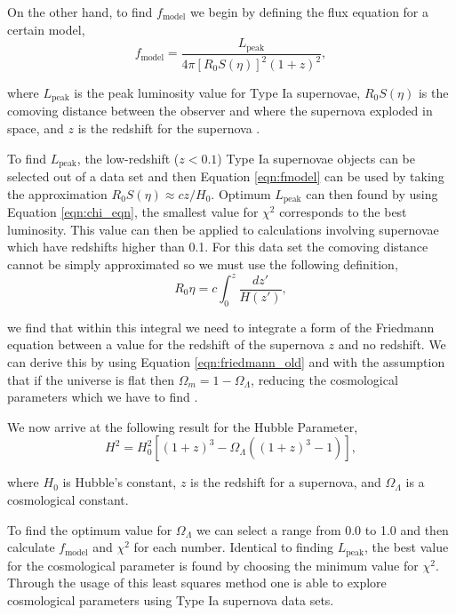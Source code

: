 \documentclass[twocolumn]{revtex4}
\begin{document}
On the other hand, to find $f_\text{model}$ we begin by defining the flux equation for a certain model,
\begin{equation}
f_\text{model}=\frac{L_\text{peak}}{4\pi [R_0 S(\eta)]^2 (1+z)^2},
\label{eqn:fmodel}
\end{equation}

where $L_\text{peak}$ is the peak luminosity value for Type Ia supernovae, $R_0 S(\eta)$ is the comoving distance between the observer and where the supernova exploded in space, and $z$ is the redshift for the supernova \cite{script}.

To find $L_\text{peak}$, the low-redshift ($z<0.1$) Type Ia supernovae objects can be selected out of a data set and then Equation \ref{eqn:fmodel} can be used by taking the approximation $R_0 S(\eta) \approx cz/H_0$. Optimum $L_\text{peak}$ can then found by using Equation \ref{eqn:chi_eqn}, the smallest value for $\chi^2$ corresponds to the best luminosity. This value can then be applied to calculations involving supernovae which have redshifts higher than 0.1. For this data set the comoving distance cannot be simply approximated so we must use the following definition,
\begin{equation}
R_0 \eta = c \int_0^z \frac{dz'}{H(z')},
\label{eqn:comoving_integral}
\end{equation}

we find that within this integral we need to integrate a form of the Friedmann equation between a value for the redshift of the supernova $z$ and no redshift. We can derive this by using Equation \ref{eqn:friedmann_old} and with the assumption that if the universe is flat then $\Omega_m = 1 - \Omega_{\Lambda}$, reducing the cosmological parameters which we have to find \cite{script}. 

We now arrive at the following result for the Hubble Parameter,
\begin{equation}
H^2 = H_0^2 [(1+z)^3 - \Omega_{\Lambda} ((1+z)^3-1)],
\label{eqn:hubble_parameter}
\end{equation}

where $H_0$ is Hubble's constant, $z$ is the redshift for a supernova, and $\Omega_\Lambda$ is a cosmological constant.

To find the optimum value for $\Omega_\Lambda$ we can select a range from 0.0 to 1.0 and then calculate $f_\text{model}$ and $\chi^2$ for each number. Identical to finding $L_\text{peak}$, the best value for the cosmological parameter is found by choosing the minimum value for $\chi^2$. Through the usage of this least squares method one is able to explore cosmological parameters using Type Ia supernova data sets.
\end{document}
